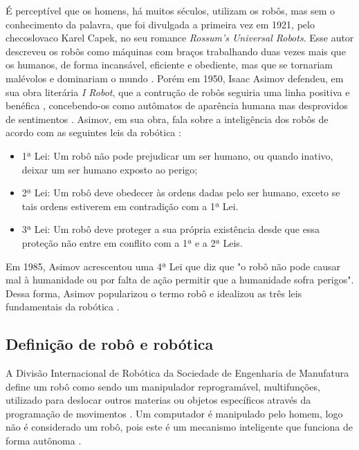 É perceptível que os homens, há muitos séculos, utilizam os robôs, mas sem o conhecimento da palavra, que foi divulgada a primeira vez em 1921, pelo checoslovaco Karel Capek, no seu romance \textit{Rossum's Universal Robots}. Esse autor descreveu os robôs como máquinas com braços trabalhando duas vezes mais que os humanos, de forma incansável, eficiente e obediente, mas que se tornariam malévolos e dominariam o mundo \cite{santos2002robotica}. Porém em 1950, Isaac Asimov defendeu, em sua obra literária \textit{I Robot}, que a contrução de robôs seguiria uma linha positiva e benéfica , concebendo-os como autômatos de aparência humana mas desprovidos de sentimentos \cite{santos2002robotica}.
Asimov, em sua obra, fala sobre a inteligência dos robôs de acordo com as seguintes leis da robótica \cite{santos2002robotica}:
\begin{itemize}
\item 1ª Lei: Um robô não pode prejudicar um ser humano, ou quando inativo, deixar um ser humano exposto ao perigo;
\item 2ª Lei: Um robô deve obedecer às ordens dadas pelo ser humano, exceto se tais ordens  estiverem em contradição com a 1ª Lei.
\item 3ª Lei: Um robô deve proteger a sua própria existência desde que essa proteção não entre em conflito com a 1ª e a 2ª Leis.
\end{itemize}
Em 1985, Asimov acrescentou uma 4ª Lei que diz que "o robô não pode causar mal à humanidade ou por falta de ação permitir que a humanidade sofra perigos". Dessa forma, Asimov popularizou o termo robô e idealizou as três leis fundamentais da robótica \cite{de2008utilizaccao}.

\subsection{Definição de robô e robótica}
A Divisão Internacional de Robótica da Sociedade de Engenharia de Manufatura define um robô como sendo um manipulador reprogramável, multifunções, utilizado para deslocar outros materias ou objetos específicos através da programação de movimentos \cite{de2008utilizaccao}. Um computador é manipulado pelo homem, logo não é considerado um robô, pois este é um mecanismo inteligente que funciona de forma autônoma \cite{curcio2008instituto}.
	

